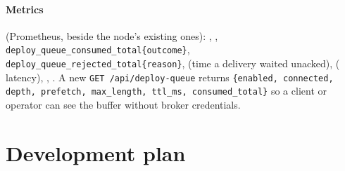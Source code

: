 \documentclass[11pt]{article}
\newcommand{\code}[1]{\texttt{#1}}
\begin{document}
\paragraph{Metrics} (Prometheus, beside the node's existing ones):
, ,
\code{deploy\_queue\_consumed\_total\{outcome\}},
\code{deploy\_queue\_rejected\_total\{reason\}},
 (time a delivery waited unacked),
 ( latency),
, . A new
\code{GET /api/deploy-queue} returns \code{\{enabled, connected, depth, prefetch,
max\_length, ttl\_ms, consumed\_total\}} so a client or operator can see the buffer
without broker credentials.

\clearpage
\section{Development plan}
\label{sec:plan}
\end{document}
